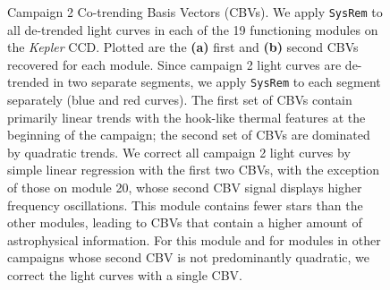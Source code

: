 \documentclass[]{emulateapj}
\begin{document}
\begin{figure}[h]
	\centering   
	\caption{Campaign 2 Co-trending Basis Vectors (CBVs). We apply \texttt{SysRem} to all 
	         de-trended light curves in each of the 19 functioning modules on the \emph{Kepler}
	         CCD. Plotted are the \textbf{(a)} first and \textbf{(b)} second CBVs recovered
	         for each module. Since campaign 2 light curves are de-trended in two separate
	         segments, we apply \texttt{SysRem} to each segment separately (blue and red
	         curves). The first set of CBVs contain primarily linear trends with the hook-like
	         thermal features at the beginning of the campaign; the second set of CBVs are
	         dominated by quadratic trends. We correct all campaign 2 light curves by simple
	         linear regression with the first two CBVs, with the exception of those on module
	         20, whose second CBV signal displays higher frequency oscillations.
	         This module contains fewer stars than the other modules, leading to CBVs that contain
	         a higher amount of astrophysical information. For this module and for modules in 
	         other campaigns whose second CBV is not predominantly quadratic, we correct the
	         light curves with a single CBV. \label{fig:cbv}}
\end{figure}



\end{document}
